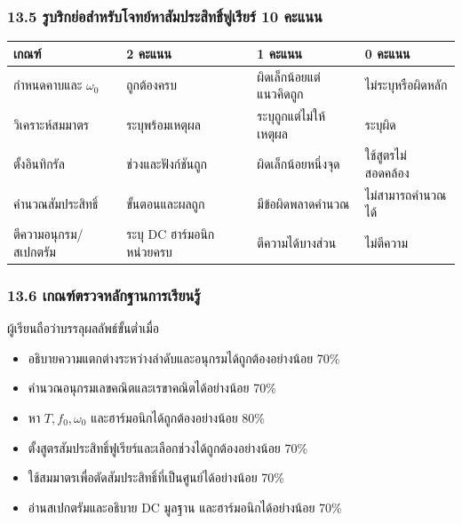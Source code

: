 \subsubsection{13.5 รูบริกย่อสำหรับโจทย์หาสัมประสิทธิ์ฟูเรียร์ 10 คะแนน}

\begin{table}[htbp]
    \centering
    \begin{tabular}{llll}
        \hline
        \textbf{เกณฑ์} & \textbf{2 คะแนน} & \textbf{1 คะแนน} & \textbf{0 คะแนน} \\
        \hline
        กำหนดคาบและ \(\omega_0\) & ถูกต้องครบ & ผิดเล็กน้อยแต่แนวคิดถูก & ไม่ระบุหรือผิดหลัก \\
        วิเคราะห์สมมาตร & ระบุพร้อมเหตุผล & ระบุถูกแต่ไม่ให้เหตุผล & ระบุผิด \\
        ตั้งอินทิกรัล & ช่วงและฟังก์ชันถูก & ผิดเล็กน้อยหนึ่งจุด & ใช้สูตรไม่สอดคล้อง \\
        คำนวณสัมประสิทธิ์ & ขั้นตอนและผลถูก & มีข้อผิดพลาดคำนวณ & ไม่สามารถคำนวณได้ \\
        ตีความอนุกรม/สเปกตรัม & ระบุ DC ฮาร์มอนิก หน่วยครบ & ตีความได้บางส่วน & ไม่ตีความ \\
        \hline
    \end{tabular}
\end{table}

\subsubsection{13.6 เกณฑ์ตรวจหลักฐานการเรียนรู้}

ผู้เรียนถือว่าบรรลุผลลัพธ์ขั้นต่ำเมื่อ

\begin{itemize}
\item
  อธิบายความแตกต่างระหว่างลำดับและอนุกรมได้ถูกต้องอย่างน้อย 70\%
\item
  คำนวณอนุกรมเลขคณิตและเรขาคณิตได้อย่างน้อย 70\%
\item
  หา \(T,f_0,\omega_0\) และฮาร์มอนิกได้ถูกต้องอย่างน้อย 80\%
\item
  ตั้งสูตรสัมประสิทธิ์ฟูเรียร์และเลือกช่วงได้ถูกต้องอย่างน้อย 70\%
\item
  ใช้สมมาตรเพื่อตัดสัมประสิทธิ์ที่เป็นศูนย์ได้อย่างน้อย 70\%
\item
  อ่านสเปกตรัมและอธิบาย DC มูลฐาน และฮาร์มอนิกได้อย่างน้อย 70\%
\end{itemize}


